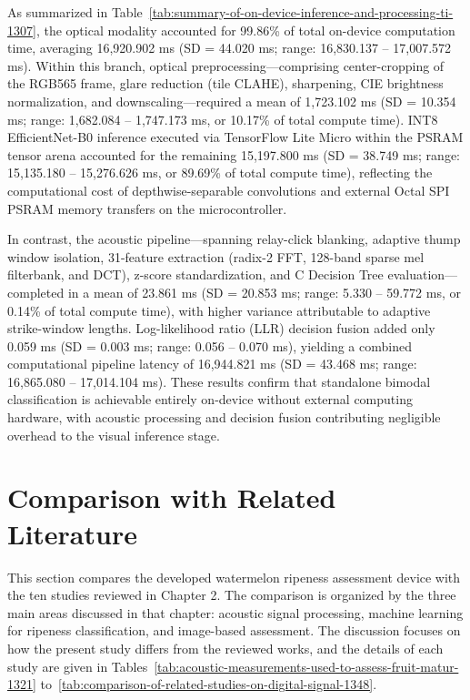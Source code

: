 \begin{thesisprose}
As summarized in Table~\ref{tab:summary-of-on-device-inference-and-processing-ti-1307}, the optical modality accounted for 99.86\% of total on-device computation time, averaging 16,920.902 ms (SD = 44.020 ms; range: 16,830.137 – 17,007.572 ms). Within this branch, optical preprocessing—comprising center-cropping of the RGB565 frame, glare reduction (tile CLAHE), sharpening, CIE brightness normalization, and downscaling—required a mean of 1,723.102 ms (SD = 10.354 ms; range: 1,682.084 – 1,747.173 ms, or 10.17\% of total compute time). INT8 EfficientNet-B0 inference executed via TensorFlow Lite Micro within the PSRAM tensor arena accounted for the remaining 15,197.800 ms (SD = 38.749 ms; range: 15,135.180 – 15,276.626 ms, or 89.69\% of total compute time), reflecting the computational cost of depthwise-separable convolutions and external Octal SPI PSRAM memory transfers on the microcontroller.

In contrast, the acoustic pipeline—spanning relay-click blanking, adaptive thump window isolation, 31-feature extraction (radix-2 FFT, 128-band sparse mel filterbank, and DCT), z-score standardization, and C Decision Tree evaluation—completed in a mean of 23.861 ms (SD = 20.853 ms; range: 5.330 – 59.772 ms, or 0.14\% of total compute time), with higher variance attributable to adaptive strike-window lengths. Log-likelihood ratio (LLR) decision fusion added only 0.059 ms (SD = 0.003 ms; range: 0.056 – 0.070 ms), yielding a combined computational pipeline latency of 16,944.821 ms (SD = 43.468 ms; range: 16,865.080 – 17,014.104 ms). These results confirm that standalone bimodal classification is achievable entirely on-device without external computing hardware, with acoustic processing and decision fusion contributing negligible overhead to the visual inference stage.

\section{Comparison with Related Literature}

This section compares the developed watermelon ripeness assessment device with the ten studies reviewed in Chapter 2. The comparison is organized by the three main areas discussed in that chapter: acoustic signal processing, machine learning for ripeness classification, and image-based assessment. The discussion focuses on how the present study differs from the reviewed works, and the details of each study are given in Tables~\ref{tab:acoustic-measurements-used-to-assess-fruit-matur-1321} to~\ref{tab:comparison-of-related-studies-on-digital-signal-1348}.


\end{thesisprose}
